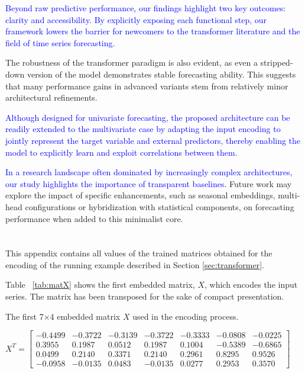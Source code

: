 \documentclass[algorithms,article,submit,pdftex,moreauthors]{Definitions/mdpi}
\begin{document}
\textcolor{blue}{Beyond raw predictive performance, our findings highlight two key outcomes: clarity and accessibility. By explicitly exposing each functional step, our framework lowers the barrier for newcomers to the transformer literature and the field of time series forecasting}.

The robustness of the transformer paradigm is also evident, as even a stripped-down version of the model demonstrates stable forecasting ability. This suggests that many performance gains in advanced variants stem from relatively minor architectural refinements.

\textcolor{blue}{Although designed for univariate forecasting, the proposed architecture can be readily extended to the multivariate case by adapting the input encoding to jointly represent the target variable and external predictors, thereby enabling the model to explicitly learn and exploit correlations between them}.

\textcolor{blue}{In a research landscape often dominated by increasingly complex architectures, our study highlights the importance of transparent baselines}. Future work may explore the impact of specific enhancements, such as seasonal embeddings, multi-head configurations or hybridization with statistical components, on forecasting performance when added to this minimalist core.

\appendixstart
\appendix
\section[\appendixname~\thesection]{} \label{sec:appendix}
This appendix contains all values of the trained matrices obtained for the encoding of the running example described in Section \ref{sec:transformer}.

\noindent Table ~\ref{tab:matX} shows the first embedded matrix, $X$, which encodes the input series. The matrix has been transposed for the sake of compact presentation.

\begin{table}[ht]
	\centering
	\caption{The first 7$\times$4 embedded matrix $X$ used in the encoding process.}
	\label{tab:matX}
	$
	X^T =	\begin{bmatrix}
-0.4499 & -0.3722 & -0.3139 & -0.3722 & -0.3333 & -0.0808 & -0.0225 \\
 0.3955 &  0.1987 &  0.0512 &  0.1987 &  0.1004 & -0.5389 & -0.6865 \\
 0.0499 &  0.2140 &  0.3371 &  0.2140 &  0.2961 &  0.8295 &  0.9526 \\
-0.0958 & -0.0135 &  0.0483 & -0.0135 &  0.0277 &  0.2953 &  0.3570
\end{bmatrix}
	$
\end{table}
\end{document}
